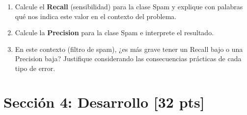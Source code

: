\documentclass[11pt,a4paper]{article}
\newcommand{\puntaje}[1]{\textbf{[#1 pts]}}
\begin{document}
\begin{enumerate}[label=\textbf{\alph*)}]
  \item Calcule el \textbf{Recall} (sensibilidad) para la clase Spam y explique con palabras qu\'e nos indica este valor en el contexto del problema.

  \vspace{2.5cm}

  \item Calcule la \textbf{Precision} para la clase Spam e interprete el resultado.

  \vspace{2.5cm}

  \item En este contexto (filtro de spam), ¿es m\'as grave tener un Recall bajo o una Precision baja? Justifique considerando las consecuencias pr\'acticas de cada tipo de error.

  \vspace{2.5cm}
\end{enumerate}

\vspace{0.3cm}

\section*{Secci\'on 4: Desarrollo \puntaje{32}}
\end{document}

